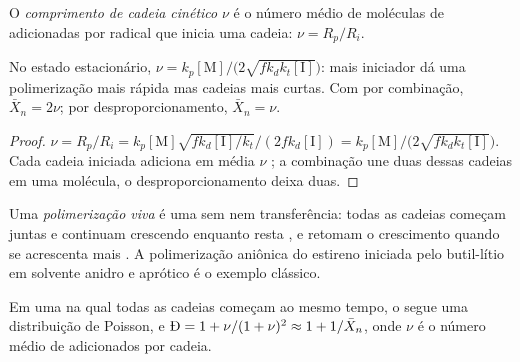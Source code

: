 \begin{definition}\label{def:b2:polymer-synthesis:chain-length}
O \emph{comprimento de cadeia cinético} $\nu$ é o número médio de moléculas de
 adicionadas por radical que inicia uma cadeia: $\nu = R_p/R_i$.
\end{definition}

\begin{proposition}\label{prop:b2:polymer-synthesis:chain-length}
No estado estacionário, $\nu = k_p[\mathrm M]/\bigl(2\sqrt{fk_dk_t[\mathrm I]}\bigr)$: mais iniciador
dá uma polimerização mais rápida mas cadeias mais curtas. Com  por combinação, $\bar X_n = 2\nu$;
por desproporcionamento, $\bar X_n = \nu$.
\end{proposition}

\begin{proof}
$\nu = R_p/R_i = k_p[\mathrm M]\sqrt{fk_d[\mathrm I]/k_t}/(2fk_d[\mathrm I]) =
k_p[\mathrm M]/\bigl(2\sqrt{fk_dk_t[\mathrm I]}\bigr)$. Cada cadeia iniciada adiciona em média $\nu$
; a combinação une duas dessas cadeias em uma molécula, o desproporcionamento deixa duas.
\end{proof}

\begin{definition}\label{def:b2:polymer-synthesis:living}
Uma \emph{polimerização viva} é uma  sem
 nem transferência: todas as cadeias começam juntas e continuam crescendo enquanto resta
, e retomam o crescimento quando se acrescenta mais . A polimerização aniônica do
estireno iniciada pelo butil-lítio em solvente anidro e aprótico é o exemplo clássico.
\end{definition}

\begin{proposition}\label{prop:b2:polymer-synthesis:living}
Em uma  na qual todas as cadeias começam ao mesmo tempo, o  segue
uma distribuição de Poisson, e $\text{\DH} = 1 + \nu/(1+\nu)^2 \approx 1 + 1/\bar X_n$, onde $\nu$ é o
número médio de  adicionados por cadeia.
\end{proposition}

